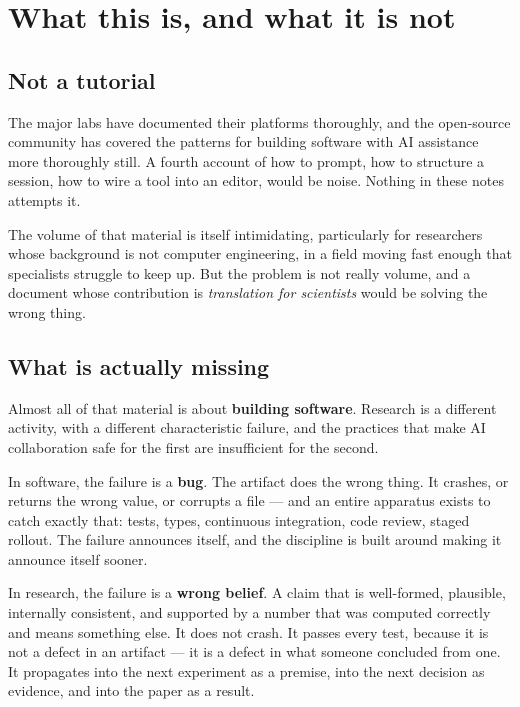 \section{What this is, and what it is not}

\subsection{Not a tutorial}

The major labs have documented their platforms thoroughly, and the open-source community has covered the patterns for building software with AI assistance more thoroughly still. A fourth account of how to prompt, how to structure a session, how to wire a tool into an editor, would be noise. Nothing in these notes attempts it.

The volume of that material is itself intimidating, particularly for researchers whose background is not computer engineering, in a field moving fast enough that specialists struggle to keep up. But the problem is not really volume, and a document whose contribution is \textit{translation for scientists} would be solving the wrong thing.

\subsection{What is actually missing}

Almost all of that material is about \textbf{building software}. Research is a different activity, with a different characteristic failure, and the practices that make AI collaboration safe for the first are insufficient for the second.

In software, the failure is a \textbf{bug}. The artifact does the wrong thing. It crashes, or returns the wrong value, or corrupts a file --- and an entire apparatus exists to catch exactly that: tests, types, continuous integration, code review, staged rollout. The failure announces itself, and the discipline is built around making it announce itself sooner.

In research, the failure is a \textbf{wrong belief}. A claim that is well-formed, plausible, internally consistent, and supported by a number that was computed correctly and means something else. It does not crash. It passes every test, because it is not a defect in an artifact --- it is a defect in what someone concluded from one. It propagates into the next experiment as a premise, into the next decision as evidence, and into the paper as a result.

